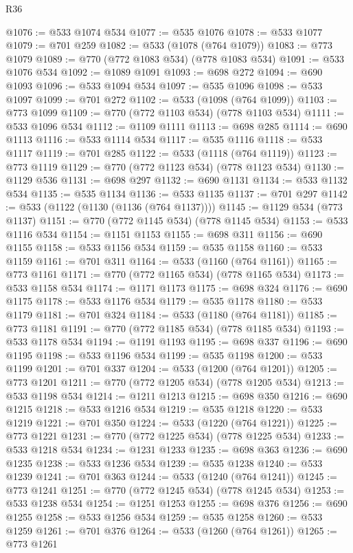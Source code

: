 \begin{lexlean}{R36}
\begin{coremodule}
@1076 := @533 @1074 @534
@1077 := @535 @1076
@1078 := @533 @1077
@1079 := @701 @259
@1082 := @533 (@1078 (@764 @1079))
@1083 := @773 @1079
@1089 := @770 (@772 @1083 @534) (@778 @1083 @534)
@1091 := @533 @1076 @534
@1092 := @1089 @1091
@1093 := @698 @272
@1094 := @690 @1093
@1096 := @533 @1094 @534
@1097 := @535 @1096
@1098 := @533 @1097
@1099 := @701 @272
@1102 := @533 (@1098 (@764 @1099))
@1103 := @773 @1099
@1109 := @770 (@772 @1103 @534) (@778 @1103 @534)
@1111 := @533 @1096 @534
@1112 := @1109 @1111
@1113 := @698 @285
@1114 := @690 @1113
@1116 := @533 @1114 @534
@1117 := @535 @1116
@1118 := @533 @1117
@1119 := @701 @285
@1122 := @533 (@1118 (@764 @1119))
@1123 := @773 @1119
@1129 := @770 (@772 @1123 @534) (@778 @1123 @534)
@1130 := @1129 @536
@1131 := @698 @297
@1132 := @690 @1131
@1134 := @533 @1132 @534
@1135 := @535 @1134
@1136 := @533 @1135
@1137 := @701 @297
@1142 := @533 (@1122 (@1130 (@1136 (@764 @1137))))
@1145 := @1129 @534 (@773 @1137)
@1151 := @770 (@772 @1145 @534) (@778 @1145 @534)
@1153 := @533 @1116 @534
@1154 := @1151 @1153
@1155 := @698 @311
@1156 := @690 @1155
@1158 := @533 @1156 @534
@1159 := @535 @1158
@1160 := @533 @1159
@1161 := @701 @311
@1164 := @533 (@1160 (@764 @1161))
@1165 := @773 @1161
@1171 := @770 (@772 @1165 @534) (@778 @1165 @534)
@1173 := @533 @1158 @534
@1174 := @1171 @1173
@1175 := @698 @324
@1176 := @690 @1175
@1178 := @533 @1176 @534
@1179 := @535 @1178
@1180 := @533 @1179
@1181 := @701 @324
@1184 := @533 (@1180 (@764 @1181))
@1185 := @773 @1181
@1191 := @770 (@772 @1185 @534) (@778 @1185 @534)
@1193 := @533 @1178 @534
@1194 := @1191 @1193
@1195 := @698 @337
@1196 := @690 @1195
@1198 := @533 @1196 @534
@1199 := @535 @1198
@1200 := @533 @1199
@1201 := @701 @337
@1204 := @533 (@1200 (@764 @1201))
@1205 := @773 @1201
@1211 := @770 (@772 @1205 @534) (@778 @1205 @534)
@1213 := @533 @1198 @534
@1214 := @1211 @1213
@1215 := @698 @350
@1216 := @690 @1215
@1218 := @533 @1216 @534
@1219 := @535 @1218
@1220 := @533 @1219
@1221 := @701 @350
@1224 := @533 (@1220 (@764 @1221))
@1225 := @773 @1221
@1231 := @770 (@772 @1225 @534) (@778 @1225 @534)
@1233 := @533 @1218 @534
@1234 := @1231 @1233
@1235 := @698 @363
@1236 := @690 @1235
@1238 := @533 @1236 @534
@1239 := @535 @1238
@1240 := @533 @1239
@1241 := @701 @363
@1244 := @533 (@1240 (@764 @1241))
@1245 := @773 @1241
@1251 := @770 (@772 @1245 @534) (@778 @1245 @534)
@1253 := @533 @1238 @534
@1254 := @1251 @1253
@1255 := @698 @376
@1256 := @690 @1255
@1258 := @533 @1256 @534
@1259 := @535 @1258
@1260 := @533 @1259
@1261 := @701 @376
@1264 := @533 (@1260 (@764 @1261))
@1265 := @773 @1261

\end{coremodule}
\end{lexlean}
